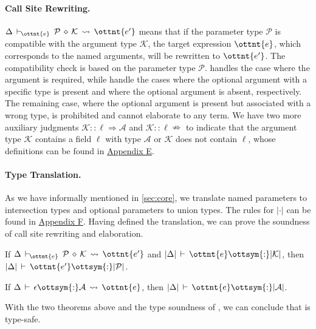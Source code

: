 \paragraph{Call Site Rewriting.}
$ \Delta \,\vdash\, _{\!\!\!\! \ottnt{e} }\:\: \mathcal{P} \,\diamond\, \mathcal{K} \,\rightsquigarrow\, \ottnt{e'} $ means that if the parameter type
$\mathcal{P}$ is compatible with the argument type $\mathcal{K}$, the target expression
$\ottnt{e}$, which corresponds to the named arguments, will be rewritten to
$\ottnt{e'}$. The compatibility check is based on the parameter type $\mathcal{P}$.
 handles the case where the argument is required, while
 handle the cases where the optional argument
with a specific type is present and where the optional argument is absent,
respectively. The remaining case, where the optional argument is present but
associated with a wrong type, is prohibited and cannot elaborate to any term.
We have two more auxiliary judgments $ \mathcal{K} :: \ell \Rightarrow \mathcal{A} $ and
$ \mathcal{K} :: \ell \nRightarrow $ to indicate that the argument type $\mathcal{K}$ contains a field $\ell$
with type $\mathcal{A}$ or $\mathcal{K}$ does not contain $\ell$, whose definitions can be found in
\hyperref[sec:appendix-lookup]{Appendix E}.

\paragraph{Type Translation.}
As we have informally mentioned in \autoref{sec:core}, we translate named
parameters to intersection types and optional parameters to union types. The
rules for $|\cdot|$ can be found in \hyperref[sec:appendix-translate]{Appendix F}. Having
defined the translation, we can prove the soundness of call site rewriting and
elaboration.

\begin{theorem}
  If $ \Delta \,\vdash\, _{\!\!\!\! \ottnt{e} }\:\: \mathcal{P} \,\diamond\, \mathcal{K} \,\rightsquigarrow\, \ottnt{e'} $ and $|  \Delta  |  \,\vdash\,  \ottnt{e}  \ottsym{:}   | \mathcal{K} | $,
  then $|  \Delta  |  \,\vdash\,  \ottnt{e'}  \ottsym{:}  |  \mathcal{P}  |$.
\end{theorem}

\begin{theorem}
  If $\Delta  \,\vdash\,  \epsilon  \ottsym{:}  \mathcal{A}  \,\rightsquigarrow\,  \ottnt{e}$, then $|  \Delta  |  \,\vdash\,  \ottnt{e}  \ottsym{:}  |  \mathcal{A}  |$.
\end{theorem}

\noindent
With the two theorems above and the type soundness of \lambdaiu, we can
conclude that \uaena is type-safe.
